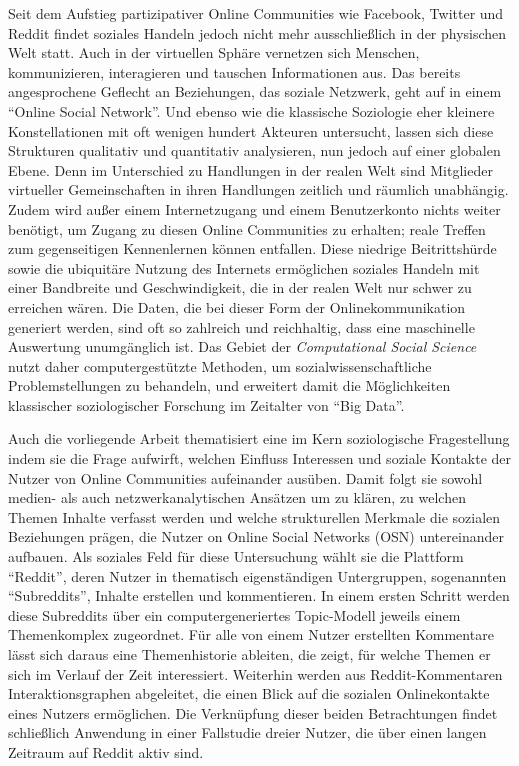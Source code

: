 \documentclass[11pt,a4paper,twoside]{article}
\begin{document}
Seit dem Aufstieg partizipativer Online Communities wie Facebook,
Twitter und Reddit findet soziales Handeln jedoch nicht mehr
ausschließlich in der physischen Welt statt. Auch in der virtuellen
Sphäre vernetzen sich Menschen, kommunizieren, interagieren und tauschen
Informationen aus. Das bereits angesprochene Geflecht an Beziehungen,
das soziale Netzwerk, geht auf in einem \enquote{Online Social Network}.
Und ebenso wie die klassische Soziologie eher kleinere Konstellationen
mit oft wenigen hundert Akteuren untersucht, lassen sich diese
Strukturen qualitativ und quantitativ analysieren, nun jedoch auf einer
globalen Ebene. Denn im Unterschied zu Handlungen in der realen Welt
sind Mitglieder virtueller Gemeinschaften in ihren Handlungen zeitlich
und räumlich unabhängig. Zudem wird außer einem Internetzugang und einem
Benutzerkonto nichts weiter benötigt, um Zugang zu diesen Online
Communities zu erhalten; reale Treffen zum gegenseitigen Kennenlernen
können entfallen. Diese niedrige Beitrittshürde sowie die ubiquitäre
Nutzung des Internets ermöglichen soziales Handeln mit einer Bandbreite
und Geschwindigkeit, die in der realen Welt nur schwer zu erreichen
wären. Die Daten, die bei dieser Form der Onlinekommunikation generiert
werden, sind oft so zahlreich und reichhaltig, dass eine maschinelle
Auswertung unumgänglich ist. Das Gebiet der \emph{Computational Social
Science} nutzt daher computergestützte Methoden, um
sozialwissenschaftliche Problemstellungen zu behandeln, und erweitert
damit die Möglichkeiten klassischer soziologischer Forschung im
Zeitalter von \enquote{Big Data}.

Auch die vorliegende Arbeit thematisiert eine im Kern soziologische
Fragestellung indem sie die Frage aufwirft, welchen Einfluss Interessen
und soziale Kontakte der Nutzer von Online Communities aufeinander
ausüben. Damit folgt sie sowohl medien- als auch netzwerkanalytischen
Ansätzen um zu klären, zu welchen Themen Inhalte verfasst werden und
welche strukturellen Merkmale die sozialen Beziehungen prägen, die
Nutzer on Online Social Networks (OSN) untereinander aufbauen. Als
soziales Feld für diese Untersuchung wählt sie die Plattform
\enquote{Reddit}, deren Nutzer in thematisch eigenständigen
Untergruppen, sogenannten \enquote{Subreddits}, Inhalte erstellen und
kommentieren. In einem ersten Schritt werden diese Subreddits über ein
computergeneriertes Topic-Modell jeweils einem Themenkomplex zugeordnet.
Für alle von einem Nutzer erstellten Kommentare lässt sich daraus eine
Themenhistorie ableiten, die zeigt, für welche Themen er sich im Verlauf
der Zeit interessiert. Weiterhin werden aus Reddit-Kommentaren
Interaktionsgraphen abgeleitet, die einen Blick auf die sozialen
Onlinekontakte eines Nutzers ermöglichen. Die Verknüpfung dieser beiden
Betrachtungen findet schließlich Anwendung in einer Fallstudie dreier
Nutzer, die über einen langen Zeitraum auf Reddit aktiv sind.
\end{document}

